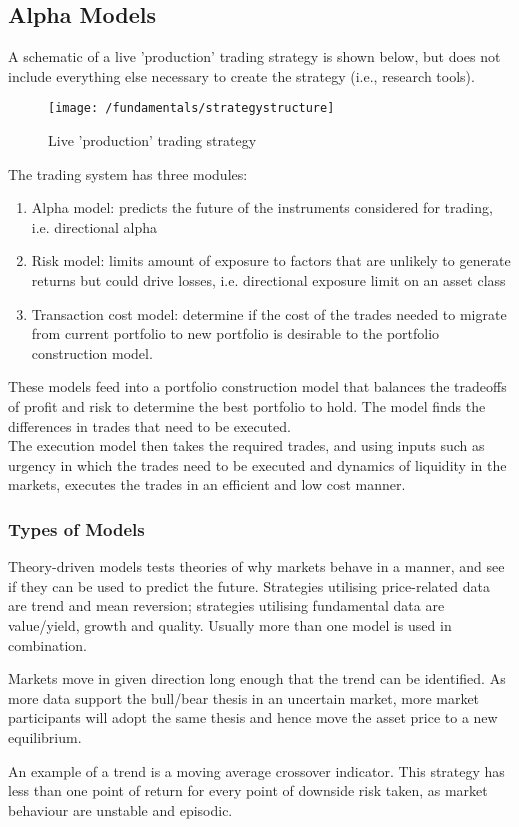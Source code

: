\subsection{Alpha Models}

A schematic of a live 'production' trading strategy is shown below, but does not include everything else necessary to create the strategy (i.e., research tools).
\begin{figure}[H]
\centering
\texttt{[image: /fundamentals/strategystructure]}
\caption{Live 'production' trading strategy}
\end{figure}
The trading system has three modules:
\begin{enumerate}[label=\roman*.]
\setlength{\itemsep}{0pt}
\item Alpha model: predicts the future of the instruments considered for trading, i.e. directional alpha
\item Risk model: limits amount of exposure to factors that are unlikely to generate returns but could drive losses, i.e. directional exposure limit on an asset class
\item Transaction cost model: determine if the cost of the trades needed to migrate from current portfolio to new portfolio is desirable to the portfolio construction model.
\end{enumerate}
These models feed into a portfolio construction model that balances the tradeoffs of profit and risk to determine the best portfolio to hold. The model finds the differences in trades that need to be executed.\\
The execution model then takes the required trades, and using inputs such as urgency in which the trades need to be executed and dynamics of liquidity in the markets, executes the trades in an efficient and low cost manner.

\subsubsection{Types of Models}

Theory-driven models tests theories of why markets behave in a manner, and see if they can be used to predict the future. Strategies utilising price-related data are trend and mean reversion; strategies utilising fundamental data are value/yield, growth and quality. Usually more than one model is used in combination.

\begin{definition}
 Markets move in given direction long enough that the trend can be identified. As more data support the bull/bear thesis in an uncertain market, more market participants will adopt the same thesis and hence move the asset price to a new equilibrium.
\end{definition}
An example of a trend is a moving average crossover indicator. This strategy has less than one point of return for every point of downside risk taken, as market behaviour are unstable and episodic.

